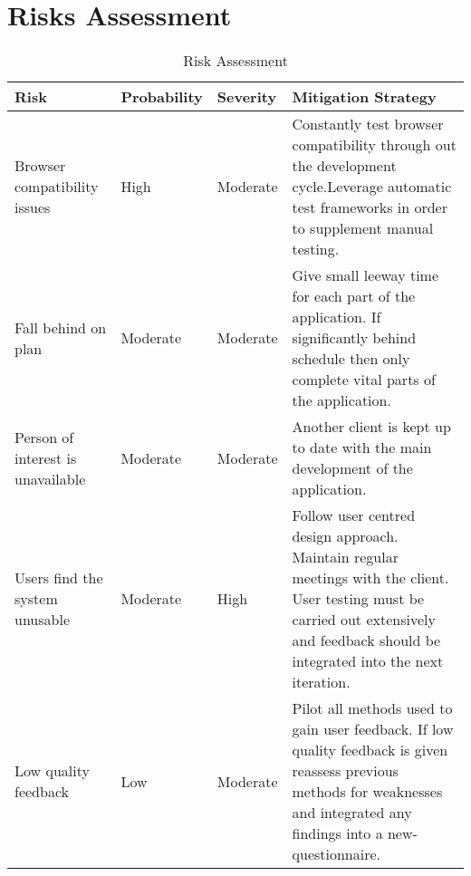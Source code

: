 \documentclass[a4paper,oneside,11pt]{report}
\begin{document}
\chapter{Risks Assessment}
\begin{center}
	\begin{table}[!ht]
    \begin{tabular}[ht]{| l | l | l | p{5cm} |}
    \hline
    Risk & Probability & Severity & Mitigation Strategy \\ 
    \hline
    Browser compatibility issues & High & Moderate & Constantly test browser compatibility through out the development cycle.Leverage automatic test frameworks in order to supplement manual testing.\\ \hline
    Fall behind on plan & Moderate & Moderate & Give small leeway time for each part of the application. If significantly behind schedule then only complete vital parts of the application.  \\ \hline
    Person of interest is unavailable & Moderate & Moderate &  Another client is kept up to date with the main development of the application.\\ 
    \hline
Users find the system unusable & Moderate & High & Follow user centred design approach. Maintain regular meetings with the client. User testing must be carried out extensively and feedback should be integrated into the next iteration. \\ 
    \hline
    Low quality feedback & Low & Moderate & Pilot all methods used to gain user feedback. If low quality feedback is given reassess previous methods for weaknesses and integrated any findings into a new- questionnaire. \\ 
    \hline
    \end{tabular}
    \caption{Risk Assessment}
\label{tab:xyz}
    \end{table}
    \end{center}
    
\end{document}
